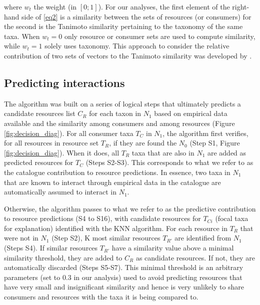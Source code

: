 \documentclass[letterpaper]{article}
\begin{document}
where $w_t$ the weight (in $[0;1]$). For our analyses, the first element of the right-hand side of \eqref{eq2} is a similarity between the sets of resources (or consumers) for the second is the Tanimoto similarity pertaining to the taxonomy of the same taxa. When $w_t = 0$ only resource or consumer sets are used to compute similarity, while $w_t = 1$ solely uses taxonomy. This approach to consider the relative contribution of two sets of vectors to the Tanimoto similarity was developed by \citet{Desjardins-Proulx}.


  \subsection{Predicting interactions}
The algorithm was built on a series of logical steps that ultimately predicts a candidate resources list $C_R$ for each taxon in $N_1$ based on empirical data available and the similarity among consumers and among resources (Figure \ref{fig:decision_diag}). For all consumer taxa $T_C$ in $N_1$, the algorithm first verifies, for all resources in resource set $T_R$, if they are found the $N_0$ (Step S1, Figure \ref{fig:decision_diag}). When it does, all $T_R$ taxa that are also in $N_1$ are added as predicted resources for $T_C$ (Steps S2-S3). This corresponds to what we refer to as the catalogue contribution to resource predictions. In essence, two taxa in $N_1$ that are known to interact through empirical data in the catalogue are automatically assumed to interact in $N_1$.

Otherwise, the algorithm passes to what we refer to as the predictive contribution to resource predictions (S4 to S16), with candidate resources for $T_{Ci}$ (focal taxa for explanation) identified with the KNN algorithm. For each resource in $T_R$ that were not in $N_1$ (Step S2), K most similar resources $T_{R'}$ are identified from $N_1$ (Steps S4). If similar resources $T_{R'}$ have a similarity value above a minimal similarity threshold, they are added to $C_R$ as candidate resources. If not, they are automatically discarded (Steps S5-S7). This minimal threshold is an arbitrary parameters (set to $0.3$ in our analysis) used to avoid predicting resources that have very small and insignificant similarity and hence is very unlikely to share consumers and resources with the taxa it is being compared to.
\end{document}
